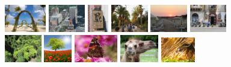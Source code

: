 \documentclass[10pt,twocolumn,letterpaper]{article}
\begin{document}
\begin{figure}[th!]
\centering
{
\includegraphics[height=1.2cm]{img1.png}
\includegraphics[height=1.2cm]{img2.png}
\includegraphics[height=1.2cm]{img3.png}
\includegraphics[height=1.2cm]{img4.png}
\includegraphics[height=1.2cm]{img5.png}
\includegraphics[height=1.2cm]{img6.png}
\includegraphics[height=1.2cm]{img7.png}
\includegraphics[height=1.2cm]{img8.png}
\includegraphics[height=1.2cm]{img9.png}
\includegraphics[height=1.2cm]{img10.png}
\includegraphics[height=1.1cm]{img11.png}
}
\end{figure}
\end{document}
